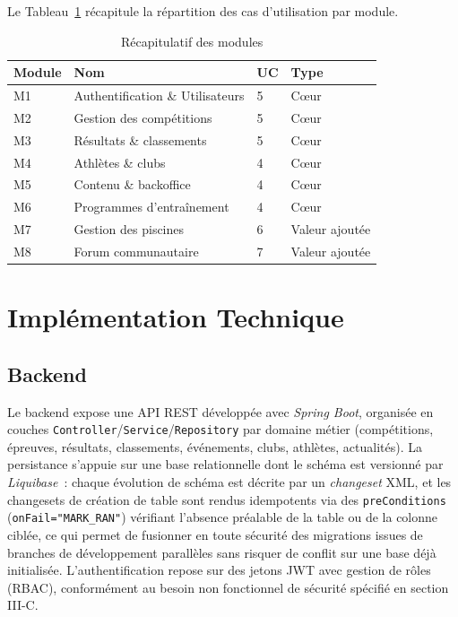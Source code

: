 \documentclass[conference]{IEEEtran}
\begin{document}
Le Tableau~\ref{tab:modules} récapitule la répartition des cas d'utilisation par module.

\begin{table}[h]
\caption{Récapitulatif des modules}
\label{tab:modules}
\centering
\begin{tabular}{p{0.9cm}p{3.3cm}p{1cm}p{1.6cm}}
\toprule
\textbf{Module} & \textbf{Nom} & \textbf{UC} & \textbf{Type} \\
\midrule
M1 & Authentification \& Utilisateurs & 5 & Cœur \\
M2 & Gestion des compétitions & 5 & Cœur \\
M3 & Résultats \& classements & 5 & Cœur \\
M4 & Athlètes \& clubs & 4 & Cœur \\
M5 & Contenu \& backoffice & 4 & Cœur \\
M6 & Programmes d'entraînement & 4 & Cœur \\
M7 & Gestion des piscines & 6 & Valeur ajoutée \\
M8 & Forum communautaire & 7 & Valeur ajoutée \\
\bottomrule
\end{tabular}
\end{table}

\section{Implémentation Technique}
\subsection{Backend}
Le backend expose une API REST développée avec \emph{Spring Boot}, organisée en couches \texttt{Controller}/\texttt{Service}/\texttt{Repository} par domaine métier (compétitions, épreuves, résultats, classements, événements, clubs, athlètes, actualités). La persistance s'appuie sur une base relationnelle dont le schéma est versionné par \emph{Liquibase}~: chaque évolution de schéma est décrite par un \emph{changeset} XML, et les changesets de création de table sont rendus idempotents via des \texttt{preConditions} (\texttt{onFail="MARK\_RAN"}) vérifiant l'absence préalable de la table ou de la colonne ciblée, ce qui permet de fusionner en toute sécurité des migrations issues de branches de développement parallèles sans risquer de conflit sur une base déjà initialisée. L'authentification repose sur des jetons JWT avec gestion de rôles (RBAC), conformément au besoin non fonctionnel de sécurité spécifié en section III-C.
\end{document}
